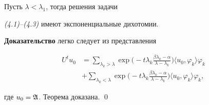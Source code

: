 \begin{thmm} Пусть $\lambda<\lambda_1$, тогда решения задачи


{\em (4.1)--(4.3)} имеют экспоненциальные дихотомии. 


\end{thmm} 


 


{\bf Доказательство} легко следует из представления 


\begin{align*} 


U^tu_0 &=\sum_{\lambda_k>\lambda}\exp\biggl( 


-t\lambda_k\frac{\beta\lambda_k-\alpha}{\lambda-\lambda_k}\biggr) 


\langle u_0,\varphi_k\rangle\varphi_k \\ 


% 


&+\sum_{\lambda_k<\lambda}\exp\biggl(


-t\lambda_k\frac{\beta\lambda_k-\alpha}{\lambda-\lambda_k}\biggr) 


\langle u_0,\varphi_k\rangle\varphi_k,


\end{align*} 


где $u_0=\frak A$. Теорема доказана. \qed 


 


